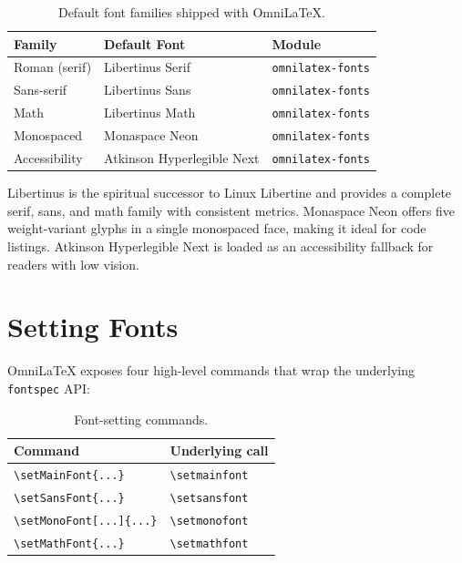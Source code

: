 \begin{table}[htbp]
  \centering
  \caption{Default font families shipped with OmniLaTeX.}
  \label{tab:default-fonts}
  \begin{tabular}{@{}lll@{}}
    \toprule
    Family        & Default Font               & Module            \\
    \midrule
    Roman (serif) & Libertinus Serif           & \texttt{omnilatex-fonts} \\
    Sans-serif    & Libertinus Sans            & \texttt{omnilatex-fonts} \\
    Math          & Libertinus Math            & \texttt{omnilatex-fonts} \\
    Monospaced    & Monaspace Neon             & \texttt{omnilatex-fonts} \\
    Accessibility & Atkinson Hyperlegible Next & \texttt{omnilatex-fonts} \\
    \bottomrule
  \end{tabular}
\end{table}

Libertinus is the spiritual successor to Linux Libertine and provides a
complete serif, sans, and math family with consistent metrics.
Monaspace Neon offers five weight-variant glyphs in a single monospaced
face, making it ideal for code listings.  Atkinson Hyperlegible Next is
loaded as an accessibility fallback for readers with low vision.

\section{Setting Fonts}

OmniLaTeX exposes four high-level commands that wrap the underlying
\texttt{fontspec} API:

\begin{table}[htbp]
  \centering
  \caption{Font-setting commands.}
  \label{tab:font-commands}
  \begin{tabular}{@{}ll@{}}
    \toprule
    Command                          & Underlying call            \\
    \midrule
    \texttt{\textbackslash setMainFont\{...\}}     & \texttt{\textbackslash setmainfont}  \\
    \texttt{\textbackslash setSansFont\{...\}}     & \texttt{\textbackslash setsansfont}  \\
    \texttt{\textbackslash setMonoFont[...]\{...\}} & \texttt{\textbackslash setmonofont}  \\
    \texttt{\textbackslash setMathFont\{...\}}     & \texttt{\textbackslash setmathfont}  \\
    \bottomrule
  \end{tabular}
\end{table}

